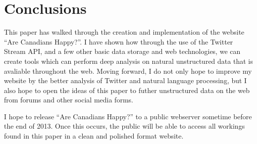 \documentclass[conference]{IEEEtran}
\begin{document}
\section{Conclusions}
\label{sec:conc}

This paper has walked through the creation and implementation of the website ``Are Canadians Happy?''.
I have shown how through the use of the Twitter Stream API, and a few other basic data storage and
web technologies, we can create tools which can perform deep analysis on natural unstructured data that
is avaliable throughout the web. Moving forward, I do not only hope to improve my website by the better
analysis of Twitter and natural language processing, but I also hope to open the ideas of this
paper to futher unstructured data on the web from forums and other social media forms.

I hope to release ``Are Canadians Happy?'' to a public webserver sometime before the end of 2013. Once
this occurs, the public will be able to access all workings found in this paper in a clean and polished 
format website.


\end{document}
